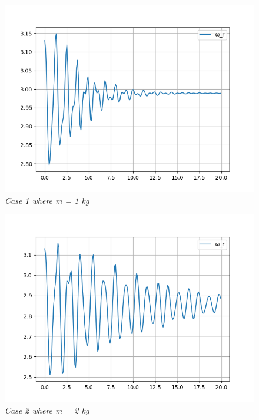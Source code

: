         \begin{figure}[H]
            \centering
            \includegraphics{Appendix/RExpPictures/F/fm1.png}
            \caption{\textit{Case 1 where m = 1 kg}}
            \label{}
        \end{figure}
            
        \begin{figure}[H]
            \centering
            \includegraphics{Appendix/RExpPictures/F/fm2.png}
            \caption{\textit{Case 2 where m = 2 kg}}
            \label{}
        \end{figure}
            
